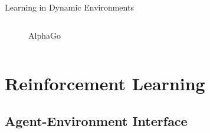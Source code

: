 \documentclass[xcolor=dvipsnames]{beamer}
\begin{document}
\begin{frame}{Learning in Dynamic Environments}
\begin{columns}
\begin{column}{0.5\textwidth}
\begin{figure}
                \caption{AlphaGo \cite{silver_mastering_2016}}
                \label{fig:autonomous-driving}
            \end{figure}
        \end{column}
    \end{columns}
\end{frame}


\section{Reinforcement Learning}
\subsection{Agent-Environment Interface}
\end{document}
